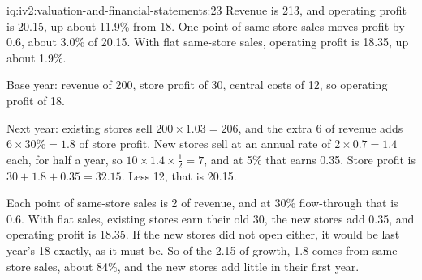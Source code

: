 \enlargethispage{-2\baselineskip}%
\begin{solution}{iq:iv2:valuation-and-financial-statements:23}
Revenue is 213, and operating profit is 20.15, up about 11.9\% from 18. One point of same-store sales moves profit by 0.6, about 3.0\% of 20.15. With flat same-store sales, operating profit is 18.35, up about 1.9\%.

Base year: revenue of 200, store profit of 30, central costs of 12, so operating profit of 18.

Next year: existing stores sell $200 \times 1.03 = 206$, and the extra 6 of revenue adds $6 \times 30\% = 1.8$ of store profit. New stores sell at an annual rate of $2 \times 0.7 = 1.4$ each, for half a year, so $10 \times 1.4 \times \tfrac12 = 7$, and at 5\% that earns 0.35. Store profit is $30 + 1.8 + 0.35 = 32.15$. Less 12, that is 20.15.

Each point of same-store sales is 2 of revenue, and at 30\% flow-through that is 0.6. With flat sales, existing stores earn their old 30, the new stores add 0.35, and operating profit is 18.35. If the new stores did not open either, it would be last year's 18 exactly, as it must be. So of the 2.15 of growth, 1.8 comes from same-store sales, about 84\%, and the new stores add little in their first year.

\end{solution}

